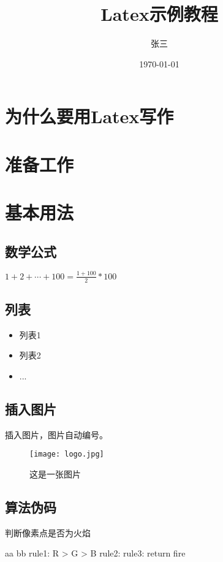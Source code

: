 \documentclass[12pt]{article}
\title{Latex示例教程}
\author{张三}
\date{\today}
\begin{document}
\doublespacing
\maketitle

\section{为什么要用Latex写作}

\section{准备工作}

\section{基本用法}
\subsection{数学公式}
$ 1+2+\cdots+100=\frac{1+100}{2}*100$

\subsection{列表}

\begin{itemize}
    \item 列表1
    \item 列表2
    \item ...
\end{itemize}

\subsection{插入图片}
插入图片，图片自动编号。
\begin{figure}[H]
    \centering
    \texttt{[image: logo.jpg]}
    \caption{这是一张图片}
    \label{}
\end{figure}

\subsection{算法伪码}

\begin{algorithm}[H]
    \caption{判断像素点是否为火焰}\label{ga-algo}
    \begin{algorithmic}[1]
        \Require aa
        \Ensure bb
        \State rule1: R > G > B
        \State rule2: 
        \State rule3: 
        \State return fire
        \EndIf 
        \EndProcedure
    \end{algorithmic}
\end{algorithm}
\end{document}
